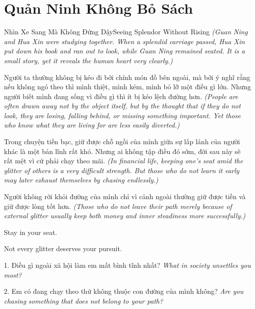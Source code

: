 \section{Quản Ninh Không Bỏ Sách}
\begin{truyen}{Nhìn Xe Sang Mà Không Đứng Dậy}{Seeing Splendor Without Rising}
\textit{(Guan Ning and Hua Xin were studying together. When a splendid carriage passed, Hua Xin put down his book and ran out to look, while Guan Ning remained seated. It is a small story, yet it reveals the human heart very clearly.)}

Người ta thường không bị kéo đi bởi chính món đồ bên ngoài, mà bởi ý nghĩ rằng nếu không ngó theo thì mình thiệt, mình kém, mình bỏ lỡ một điều gì lớn. Nhưng người biết mình đang sống vì điều gì thì ít bị kéo lệch đường hơn.
\textit{(People are often drawn away not by the object itself, but by the thought that if they do not look, they are losing, falling behind, or missing something important. Yet those who know what they are living for are less easily diverted.)}

Trong chuyện tiền bạc, giữ được chỗ ngồi của mình giữa sự lấp lánh của người khác là một bản lĩnh rất khó. Nhưng ai không tập điều đó sớm, đời sau này sẽ rất mệt vì cứ phải chạy theo mãi.
\textit{(In financial life, keeping one’s seat amid the glitter of others is a very difficult strength. But those who do not learn it early may later exhaust themselves by chasing endlessly.)}
\end{truyen}

\begin{baihoc}
Người không rời khỏi đường của mình chỉ vì cảnh ngoài thường giữ được tiền và giữ được lòng tốt hơn.
\textit{(Those who do not leave their path merely because of external glitter usually keep both money and inner steadiness more successfully.)}
\end{baihoc}

\begin{ghinhoanh}
Stay in your seat.

Not every glitter deserves your pursuit.
\end{ghinhoanh}

\begin{tuhocnhanh}
1. Điều gì ngoài xã hội làm em mất bình tĩnh nhất? \textit{What in society unsettles you most?}

2. Em có đang chạy theo thứ không thuộc con đường của mình không? \textit{Are you chasing something that does not belong to your path?}
\end{tuhocnhanh}
\ngancach

